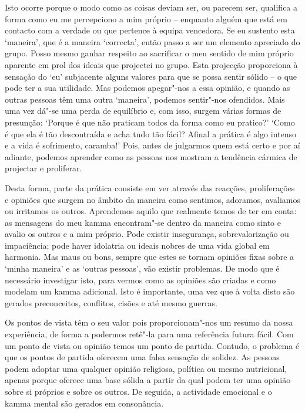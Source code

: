 Isto ocorre porque o modo como as coisas
deviam ser, ou parecem ser, qualifica a forma como eu me percepciono a mim
próprio -- enquanto alguém que está em contacto com a verdade ou que pertence à
equipa vencedora. Se eu sustento esta `maneira', que é a maneira `correcta',
então passo a ser um elemento apreciado do grupo. Posso mesmo ganhar respeito ao
sacrificar o meu sentido de mim próprio aparente em prol dos ideais que
projectei no grupo. Esta projecção proporciona à sensação do `eu' subjacente
alguns valores para que se possa sentir sólido -- o que pode ter a sua
utilidade. Mas podemos apegar"-nos a essa opinião, e quando as outras pessoas
têm uma outra `maneira', podemos sentir"-nos ofendidos. Mais uma vez dá"-se uma
perda de equilíbrio e, com isso, surgem várias formas de presunção: `Porque é
que não praticam todos da forma como eu pratico?' `Como é que ela é tão
descontraída e acha tudo tão fácil? Afinal a prática é algo intenso e a vida é
sofrimento, caramba!' Pois, antes de julgarmos quem está certo e por aí adiante,
podemos aprender como as pessoas nos mostram a tendência cármica de projectar e
proliferar.

Desta forma, parte da prática consiste em ver através das reacções,
proliferações e opiniões que surgem no âmbito da maneira como sentimos,
adoramos, avaliamos ou irritamos os outros. Aprendemos aquilo que realmente
temos de ter em conta: as mensagens do meu kamma encontram"-se dentro da maneira
como sinto e avalio os outros e a mim próprio. Pode existir insegurança,
sobrevalorização ou impaciência; pode haver idolatria ou ideais nobres de uma
vida global em harmonia. Mas maus ou bons, sempre que estes se tornam opiniões
fixas sobre a `minha maneira' e as `outras pessoas', vão existir problemas. De
modo que é necessário investigar isto, para vermos como as opiniões são criadas
e como modelam um kamma adicional. Isto é importante, uma vez que à volta disto
são gerados preconceitos, conflitos, cisões e até mesmo guerras.

Os pontos de vista têm o seu valor pois proporcionam"-nos um resumo da nossa
experiência, de forma a podermos retê"-la para uma referência futura fácil. Com
um ponto de vista ou opinião temos um ponto de partida. Contudo, o problema é
que os pontos de partida oferecem uma falsa sensação de solidez. As pessoas
podem adoptar uma qualquer opinião religiosa, política ou mesmo nutricional,
apenas porque oferece uma base sólida a partir da qual podem ter uma opinião
sobre si próprios e sobre os outros. De seguida, a actividade emocional e o
kamma mental são gerados em consonância.

